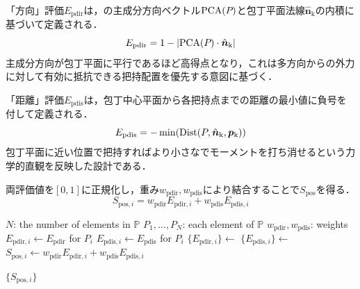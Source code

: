 「方向」評価$E_{\mathrm{pdir}}$は，{\nameholdingpointset}の主成分方向ベクトル$\mathrm{PCA}(\equholdingpointset)$と包丁平面法線$\hat{\bm{n}}_{\mathrm{k}}$の内積に基づいて定義される．
\begin{equation}
E_{\mathrm{pdir}} = 1 - |\mathrm{PCA}(\equholdingpointset) \cdot \hat{\bm{n}}_{\mathrm{k}}|
\end{equation}
主成分方向が包丁平面に平行であるほど高得点となり，これは多方向からの外力に対して有効に抵抗できる把持配置を優先する意図に基づく．

「距離」評価$E_{\mathrm{pdis}}$は，包丁中心平面から各把持点までの距離の最小値に負号を付して定義される．
\begin{equation}
E_{\mathrm{pdis}} = -\min(\mathrm{Dist}(\equholdingpointset, \hat{\bm{n}}_{\mathrm{k}}, \bm{p}_{\mathrm{k}}))
\end{equation}
包丁平面に近い位置で把持すればより小さな{\namefingerforce}でモーメントを打ち消せるという力学的直観を反映した設計である．

両評価値を$[0,1]$に正規化し，重み$w_{\mathrm{pdir}}, w_{\mathrm{pdis}}$により結合することで$S_{\mathrm{pos}}$を得る．
\begin{equation}
    S_{\mathrm{pos,}i} = w_{\mathrm{pdir}} E_{\mathrm{pdir,}i} + w_{\mathrm{pdis}} E_{\mathrm{pdis,}i}
    \label{equ:holding_score_pos_final}
\end{equation}

\begin{algorithm}[H]
\caption{Calculate the positional score}
\label{algo:holding_score_pos}
\begin{algorithmic}[1]
\setlength{\baselineskip}{11pt}
    \State $N$: the number of elements in $\mathbb{P}$
    \State $P_1,\ldots,P_N$: each element of $\mathbb{P}$
    \State $w_\mathrm{pdir}, w_\mathrm{pdis}$: weights
        \State $E_{\mathrm{pdir,}i}\gets E_\mathrm{pdir}$ for $P_i$
        \State $E_{\mathrm{pdis,}i}\gets E_\mathrm{pdis}$ for $P_i$ \label{algoline:holding_CalDynamicScore-pos-score}
    \EndFor
    \State $\{E_{\mathrm{pdir,}i}\}\gets$  \label{algoline:holding_score-pos-final-st}
    \State $\{E_{\mathrm{pdis,}i}\}\gets$ 
        \State $S_{\mathrm{pos},i} \gets w_\mathrm{pdir} E_{\mathrm{pdir},i} + w_\mathrm{pdis} E_{\mathrm{pdis},i}$
    \EndFor  \label{algoline:holding_score-pos-final-ed}

    \State \Return $\{S_{\mathrm{pos},i}\}$
\EndFunction
\end{algorithmic}
\end{algorithm}



